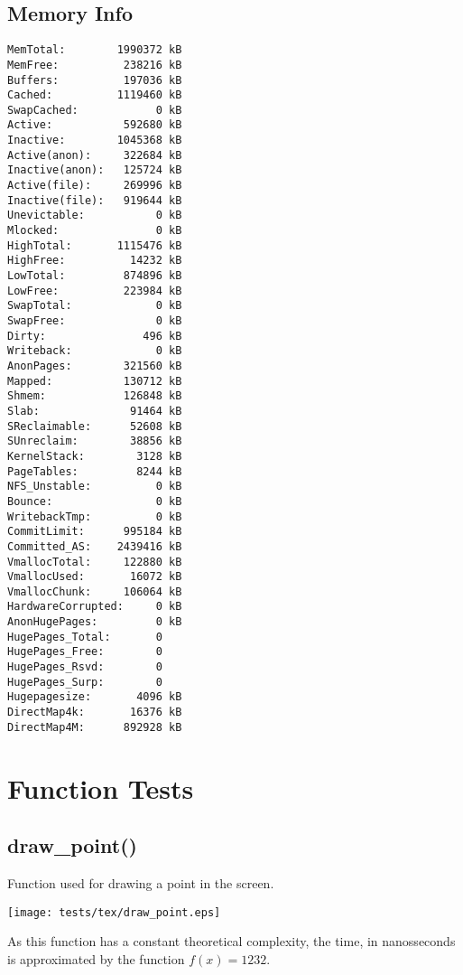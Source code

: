 \documentclass{article}
\begin{document}
\subsection{Memory Info}
\begin{verbatim}
MemTotal:        1990372 kB
MemFree:          238216 kB
Buffers:          197036 kB
Cached:          1119460 kB
SwapCached:            0 kB
Active:           592680 kB
Inactive:        1045368 kB
Active(anon):     322684 kB
Inactive(anon):   125724 kB
Active(file):     269996 kB
Inactive(file):   919644 kB
Unevictable:           0 kB
Mlocked:               0 kB
HighTotal:       1115476 kB
HighFree:          14232 kB
LowTotal:         874896 kB
LowFree:          223984 kB
SwapTotal:             0 kB
SwapFree:              0 kB
Dirty:               496 kB
Writeback:             0 kB
AnonPages:        321560 kB
Mapped:           130712 kB
Shmem:            126848 kB
Slab:              91464 kB
SReclaimable:      52608 kB
SUnreclaim:        38856 kB
KernelStack:        3128 kB
PageTables:         8244 kB
NFS_Unstable:          0 kB
Bounce:                0 kB
WritebackTmp:          0 kB
CommitLimit:      995184 kB
Committed_AS:    2439416 kB
VmallocTotal:     122880 kB
VmallocUsed:       16072 kB
VmallocChunk:     106064 kB
HardwareCorrupted:     0 kB
AnonHugePages:         0 kB
HugePages_Total:       0
HugePages_Free:        0
HugePages_Rsvd:        0
HugePages_Surp:        0
Hugepagesize:       4096 kB
DirectMap4k:       16376 kB
DirectMap4M:      892928 kB
\end{verbatim}
\section{Function Tests}
\subsection{draw\_point()}
Function used for drawing a point in the screen.


\texttt{[image: tests/tex/draw\_point.eps]}

As this function has a constant theoretical
complexity, the time, in nanosseconds is 
approximated by the function $f(x)=1232$.
\end{document}
